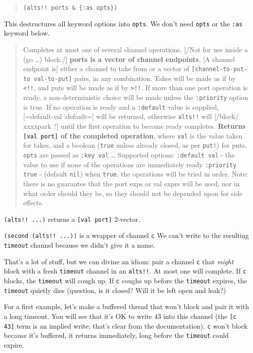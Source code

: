 \documentclass[10pt,oneside,x11names]{article}
\begin{document}
\begin{quote}
\texttt{(alts!! ports \& \{:as opts\})}
\end{quote}

This destructures all keyword options into \texttt{opts}. We don't need \texttt{opts} or
the \texttt{:as} keyword below.

\begin{quote}
Completes at most one of several channel operations. [/Not for use inside a
(go \ldots{}) block./] \textbf{ports is a vector of channel endpoints}, [A channel
endpoint is] either a channel to take from or a vector of \texttt{[channel-to-put-to
  val-to-put]} pairs, in any combination. Takes will be made as if by \texttt{<!!}, and
puts will be made as if by \texttt{>!!}. If more than one port operation is ready, a
non-deterministic choice will be made unless the \texttt{:priority} option is true.
If no operation is ready and a \texttt{:default} value is supplied, [=default-val
:default=] will be returned, otherwise \texttt{alts!!} will [/block/ xxxxpark ?]
until the first operation to become ready completes. \textbf{Returns \texttt{[val port]} of
the completed operation}, where \texttt{val} is the value taken for takes, and a
boolean (\texttt{true} unless already closed, as per \texttt{put!}) for puts. \texttt{opts} are
passed as \texttt{:key val} \ldots{} Supported options: \texttt{:default val} - the value to use
if none of the operations are immediately ready \texttt{:priority true} - (default
\texttt{nil}) when \texttt{true}, the operations will be tried in order. Note: there is no
guarantee that the port exps or val exprs will be used, nor in what order
should they be, so they should not be depended upon for side effects.
\end{quote}

\texttt{(alts!! ...)} returns a \texttt{[val port]} 2-vector.

\texttt{(second (alts!! ...))} is a wrapper of channel \texttt{c} We can't write to
the resulting \texttt{timeout} channel because we didn't give it a name.

That's a lot of stuff, but we can divine an idiom: pair a channel \texttt{c}
that \emph{might} block with a fresh \texttt{timeout} channel in an \texttt{alts!!}. At
most one will complete. If \texttt{c} blocks, the \texttt{timeout} will cough up. If
\texttt{c} coughs up before the \texttt{timeout} expires, the \texttt{timeout} quietly dies
(question, is it closed? Will it be left open and leak?)

For a first example, let's make a buffered thread that won't block and
pair it with a long timeout. You will see that it's OK to write \(43\)
into this channel (the \texttt{[c 43]} term is an implied write; that's clear
from the documentation). \texttt{c} won't block because it's buffered, it
returns immediately, long before the \texttt{timeout} could expire.
\end{document}
